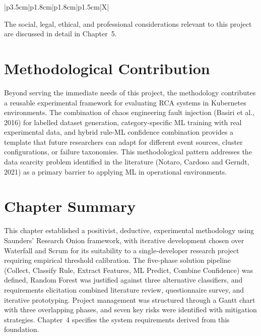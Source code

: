 \begin{xltabular}{\textwidth}{|p{3.5cm}|p{1.8cm}|p{1.8cm}|p{1.5cm}|X|}
\caption{Project Risk Register}
\label{tab:risks}
\end{xltabular}

The social, legal, ethical, and professional considerations relevant to this project are discussed in detail in Chapter~5.

\section{Methodological Contribution}
Beyond serving the immediate needs of this project, the methodology contributes a reusable experimental framework for evaluating RCA systems in Kubernetes environments. The combination of chaos engineering fault injection (Basiri et al., 2016) for labelled dataset generation, category-specific ML training with real experimental data, and hybrid rule-ML confidence combination provides a template that future researchers can adapt for different event sources, cluster configurations, or failure taxonomies. This methodological pattern addresses the data scarcity problem identified in the literature (Notaro, Cardoso and Gerndt, 2021) as a primary barrier to applying ML in operational environments.

\section{Chapter Summary}
This chapter established a positivist, deductive, experimental methodology using Saunders' Research Onion framework, with iterative development chosen over Waterfall and Scrum for its suitability to a single-developer research project requiring empirical threshold calibration. The five-phase solution pipeline (Collect, Classify Rule, Extract Features, ML Predict, Combine Confidence) was defined, Random Forest was justified against three alternative classifiers, and requirements elicitation combined literature review, questionnaire survey, and iterative prototyping. Project management was structured through a Gantt chart with three overlapping phases, and seven key risks were identified with mitigation strategies. Chapter~4 specifies the system requirements derived from this foundation.